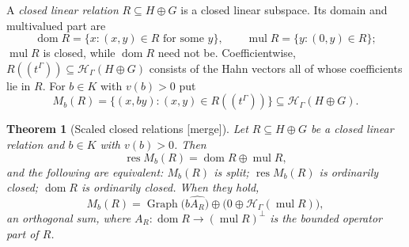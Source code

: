 \documentclass[11pt,letterpaper]{article}
\numberwithin{equation}{section}
\newtheorem{theorem}{Theorem}[section]
\theoremstyle{definition}
\theoremstyle{remark}
\newcommand{\K}{K}
\newcommand{\HH}[1]{\mathscr H_\Gamma(#1)}
\newcommand{\dom}{\operatorname{dom}}
\newcommand{\mul}{\operatorname{mul}}
\newcommand{\res}{\operatorname{res}}
\newcommand{\Graph}{\operatorname{Graph}}
\newcommand{\mergetag}{\textup{\textsf{\small[merge]}}}
\begin{document}
A \emph{closed linear relation} $R\subseteq H\oplus G$ is a closed linear
subspace. Its domain and multivalued part are
\[
 \dom R=\{x:(x,y)\in R\text{ for some }y\},\qquad
 \mul R=\{y:(0,y)\in R\};
\]
$\mul R$ is closed, while $\dom R$ need not be. Coefficientwise,
$R((t^\Gamma))\subseteq\HH{H\oplus G}$ consists of the Hahn vectors all of
whose coefficients lie in $R$. For $b\in\K$ with $v(b)>0$ put
\[
 M_b(R)=\{(x,by):(x,y)\in R((t^\Gamma))\}\subseteq\HH{H\oplus G}.
\]

\begin{theorem}[Scaled closed relations \mergetag]\label{hgeo:thm:relation}
Let $R\subseteq H\oplus G$ be a closed linear relation and $b\in\K$ with
$v(b)>0$. Then
\begin{equation}\label{hgeo:eq:relationresidue}
 \res M_b(R)=\dom R\oplus\mul R,
\end{equation}
and the following are equivalent: $M_b(R)$ is split; $\res M_b(R)$ is
ordinarily closed; $\dom R$ is ordinarily closed. When they hold,
\begin{equation}\label{hgeo:eq:relationsplit}
 M_b(R)=\Graph\bigl(b\widehat{A_R}\bigr)\oplus\bigl(0\oplus\HH{\mul R}\bigr),
\end{equation}
an orthogonal sum, where $A_R:\dom R\to(\mul R)^\perp$ is the bounded
operator part of $R$.
\end{theorem}
\end{document}
